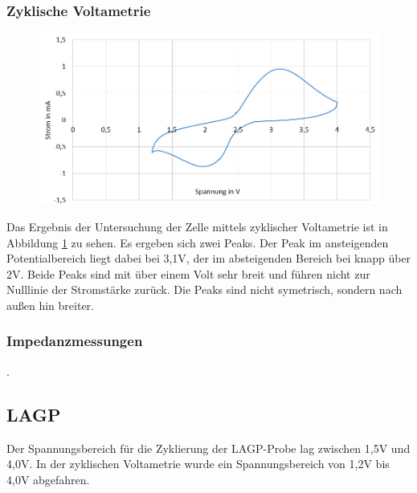 \documentclass[a4paper, 11pt, headsepline,footsepline,twoside,abstract]{scrbook}
\begin{document}
\subsubsection{Zyklische Voltametrie}
\begin{figure}
	\centering
	\includegraphics[width=0.85\columnwidth]{images/CV_LATP.jpg}
	\caption{}
	\label{cv_LATP}
\end{figure}
Das Ergebnis der Untersuchung der Zelle mittels zyklischer Voltametrie ist in Abbildung \ref{cv_LATP} zu sehen. Es ergeben sich zwei Peaks. Der Peak im ansteigenden Potentialbereich liegt dabei bei 3,1V, der im absteigenden Bereich bei knapp über 2V. Beide Peaks sind mit über einem Volt sehr breit und führen nicht zur Nulllinie der Stromstärke zurück. Die Peaks sind nicht symetrisch, sondern nach außen hin breiter.
\subsubsection{Impedanzmessungen}
.
\newpage
\subsection{LAGP}
Der Spannungsbereich für die Zyklierung der LAGP-Probe lag zwischen 1,5V und 4,0V. In der zyklischen Voltametrie wurde ein Spannungsbereich von 1,2V bis 4,0V abgefahren.
\end{document}
